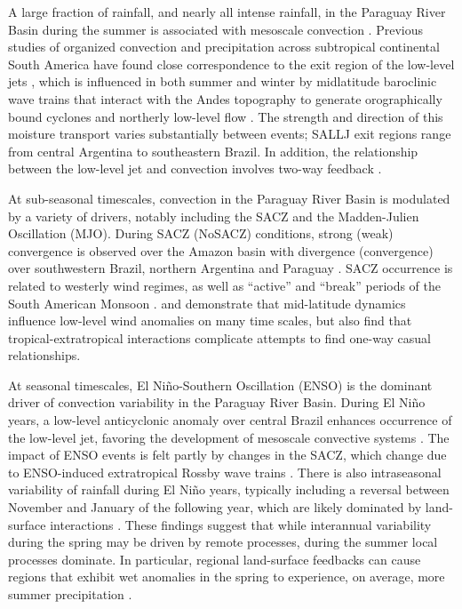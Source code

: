 \documentclass[twocol]{ametsoc}
\begin{document}
A large fraction of rainfall, and nearly all intense rainfall, in the Paraguay River Basin during the summer is associated with mesoscale convection \citep{Velasco1987}.
Previous studies of organized convection and precipitation across subtropical continental South America have found close correspondence to the exit region of the low-level jets \citep{Saulo:2007km,Salio:2007gd,Marengo2004,Velasco1987}, which is influenced in both summer and winter by midlatitude baroclinic wave trains that interact with the Andes topography to generate orographically bound cyclones and northerly low-level flow \citep{Campetella:2002hx,Seluchi:2006bi,Boers:2014gt}.
The strength and direction of this moisture transport varies substantially between events; SALLJ exit regions range from central Argentina \citep[``Chaco Jet Events'';][]{Salio:2002ev} to southeastern Brazil. In addition, the relationship between the low-level jet and convection involves two-way feedback \citep{Saulo:2007km}.

At sub-seasonal timescales, convection in the Paraguay River Basin is modulated by a variety of drivers, notably including the SACZ and the Madden-Julien Oscillation (MJO).
During SACZ (NoSACZ) conditions, strong (weak) convergence is observed over the Amazon basin with divergence (convergence) over southwestern Brazil, northern Argentina and Paraguay \citep{Herdies:2002jy,Carvalho2010}.
SACZ occurrence is related to westerly wind regimes, as well as ``active'' and ``break'' periods of the South American Monsoon \citep{Marengo2004}.
\citet{Carvalho2004} and \citet{Jones2002} demonstrate that mid-latitude dynamics influence low-level wind anomalies on many time scales, but also find that tropical-extratropical interactions complicate attempts to find one-way casual relationships.

At seasonal timescales, El Ni\~no-Southern Oscillation (ENSO) is the dominant driver of convection variability in the Paraguay River Basin.
During El Ni\~no years, a low-level anticyclonic anomaly over central Brazil enhances occurrence of the low-level jet, favoring the development of mesoscale convective systems \citep{Velasco1987}.
The impact of ENSO events is felt partly by changes in the SACZ, which change due to ENSO-induced extratropical Rossby wave trains \citep{Grimm:2011vp}.
There is also intraseasonal variability of rainfall during El Ni\~no years, typically including a reversal between November and January of the following year, which are likely dominated by land-surface interactions \citep[see][]{Grimm2009,Grimm2003}.
These findings suggest that while interannual variability during the spring may be driven by remote processes,  during the summer local processes dominate.
In particular, regional land-surface feedbacks can cause regions that exhibit wet anomalies in the spring to experience, on average, more summer precipitation \citep{Grimm:2009bq}.
\end{document}
